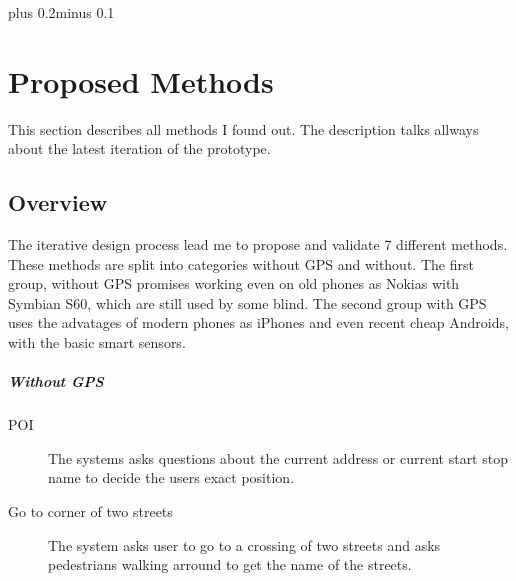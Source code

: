 \documentclass[11pt,oneside,a4paper]{book}
\begin{document}
	\mainbodystarts
	\normalfont
	\baselineskip plus 0.2\baselineskip minus 0.1\baselineskip
	
	
	
	
	
	
	\chapter{Proposed Methods}
	This section describes all methods I found out. The description talks allways about the latest iteration of the prototype.
		\section{Overview}
			The iterative design process lead me to propose and validate 7 different methods. These methods are split into categories without GPS and without. The first group, without GPS promises working even on old phones as Nokias with Symbian S60, which are still used by some blind. The second group with GPS uses the advatages of modern phones as iPhones and even recent cheap Androids, with the basic smart sensors.
			\paragraph{Without GPS}
				\begin{description}
					\item [POI]
						The systems asks questions about the current address or current start stop name to decide the users exact position.
					\item [Go to corner of two streets]
						The system asks user to go to a crossing of two streets and asks pedestrians walking arround to get the name of the streets. 
				\end{description}
\end{document}
